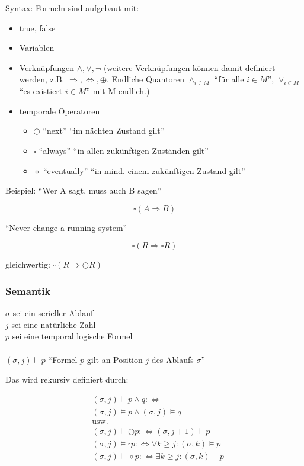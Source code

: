 Syntax: Formeln sind aufgebaut mit:

\begin{itemize}
	\item true, false
	\item Variablen
	\item Verknüpfungen $ \wedge, \vee, \neg $ (weitere Verknüpfungen können damit definiert werden, z.B. $ \Rightarrow, \Leftrightarrow, \oplus $. Endliche Quantoren $ \wedge_{i \in M} $ "`für alle $ i \in M $"', $ \vee_{i \in M} $ "`es existiert $ i \in M $"' mit M endlich.)
	\item temporale Operatoren
	\begin{itemize}
		\item $ \bigcirc $ "`next"' "`im nächten Zustand gilt"'
		\item $ \square $ "`always"' "`in allen zukünftigen Zuständen gilt"'
		\item $ \diamond $ "`eventually"' "`in mind. einem zukünftigen Zustand gilt"' 
	\end{itemize}
\end{itemize}

Beispiel: "`Wer A sagt, muss auch B sagen"'

\begin{equation*}
\square (A \Rightarrow B)
\end{equation*}

"`Never change a running system"'

\begin{equation*}
\square (R \Rightarrow \square R)
\end{equation*}

gleichwertig: $ \square (R \Rightarrow \bigcirc R) $

\subsubsection*{Semantik}

$ \sigma $ sei ein serieller Ablauf\\
$ j $ sei eine natürliche Zahl\\
$ p $ sei eine temporal logische Formel\\
\\ %
$ (\sigma, j) \models p $ \quad "`Formel $ p $ gilt an Position $ j $ des Ablaufs $ \sigma $"'

Das wird rekursiv definiert durch:

\begin{align*}
& (\sigma, j) \models p \wedge q : \Leftrightarrow\\
& (\sigma, j) \models p \wedge (\sigma, j) \models q\\
& \text{usw.} \\ %
& (\sigma, j) \models \bigcirc p : \Leftrightarrow (\sigma, j + 1) \models p\\
& (\sigma, j) \models \square p : \Leftrightarrow \forall k \geq j: (\sigma, k) \models p\\
& (\sigma, j) \models \diamond p : \Leftrightarrow \exists k \geq j: (\sigma, k) \models p
\end{align*}

